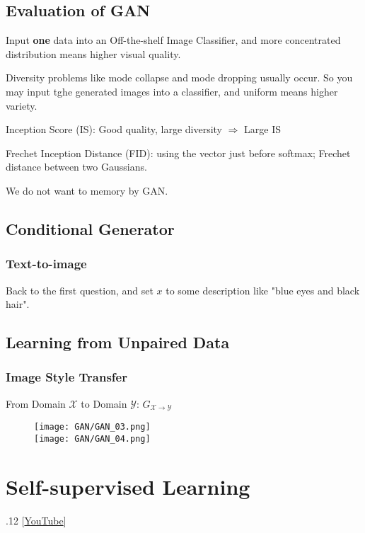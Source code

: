 \documentclass[11pt]{book}
\begin{document}
\section{Evaluation of GAN}
Input \textbf{one} data into an Off-the-shelf Image Classifier, and more concentrated distribution means higher visual quality.

Diversity problems like mode collapse and mode dropping usually occur. So you may input tghe generated images into a classifier, and uniform means higher variety.

Inception Score (IS): Good quality, large diversity $\Longrightarrow$ Large IS

Frechet Inception Distance (FID): using the vector just before softmax; Frechet distance between two Gaussians.

We do not want to memory by GAN.

\section{Conditional Generator}
\subsection*{Text-to-image}
Back to the first question, and set $x$ to some description like "blue eyes and black hair".

\section{Learning from Unpaired Data}
\subsection*{Image Style Transfer}
From Domain $\mathcal{X}$ to Domain $\mathcal{Y}$: $G_{\mathcal{X}\to\mathcal{Y}}$

\begin{figure}[htbp]
    \centering
    \texttt{[image: GAN/GAN\_03.png]}\\
    \texttt{[image: GAN/GAN\_04.png]}
\end{figure}

\chapter{Self-supervised Learning}
.12 [\href{https://www.youtube.com/watch?v=e422eloJ0W4&list=PLJV_el3uVTsMhtt7_Y6sgTHGHp1Vb2P2J&index=18}{YouTube}]
\end{document}
